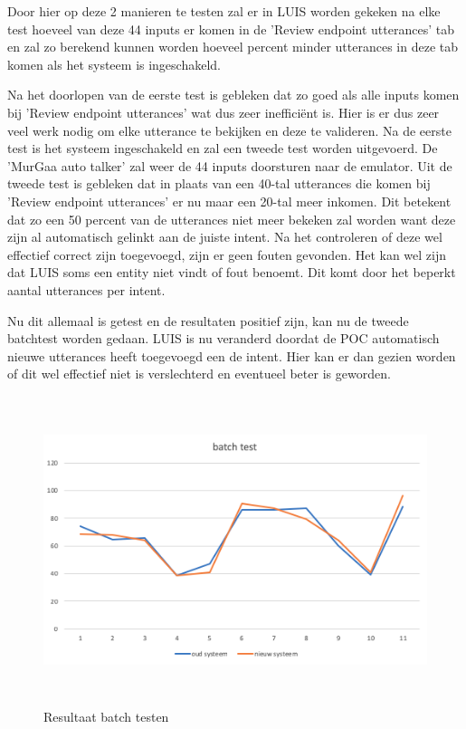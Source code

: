 Door hier op deze 2 manieren te testen zal er in LUIS worden gekeken na elke test hoeveel van deze 44 inputs er komen in de 'Review endpoint utterances' tab en zal zo berekend kunnen worden hoeveel percent minder utterances in deze tab komen als het systeem is ingeschakeld.

Na het doorlopen van de eerste test is gebleken dat zo goed als alle inputs komen bij 'Review endpoint utterances' wat dus zeer inefficiënt is. Hier is er dus zeer veel werk nodig om elke utterance te bekijken en deze te valideren. Na de eerste test is het systeem ingeschakeld en zal een tweede test worden uitgevoerd. De 'MurGaa auto talker' zal weer de 44 inputs doorsturen naar de emulator. Uit de tweede test is gebleken dat in plaats van een 40-tal utterances die komen bij 'Review endpoint utterances' er nu maar een 20-tal meer inkomen. Dit betekent dat zo een 50 percent van de utterances niet meer bekeken zal worden want deze zijn al automatisch gelinkt aan de juiste intent. Na het controleren of deze wel effectief correct zijn toegevoegd, zijn er geen fouten gevonden. Het kan wel zijn dat LUIS soms een entity niet vindt of fout benoemt. Dit komt door het beperkt aantal utterances per intent.

Nu dit allemaal is getest en de resultaten positief zijn, kan nu de tweede batchtest worden gedaan. LUIS is nu veranderd doordat de POC automatisch nieuwe utterances heeft toegevoegd een de intent. Hier kan er dan gezien worden of dit wel effectief niet is verslechterd en eventueel beter is geworden.

\begin{figure}[h!]
	\centering
	\includegraphics[height=9cm]{img/grafiek.png}
	\caption{Resultaat batch testen}
	\label{fig:batchtest}
\end{figure}


